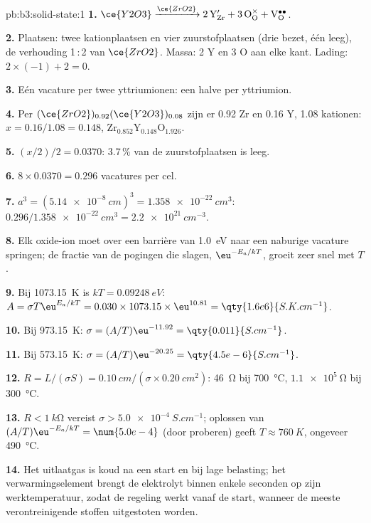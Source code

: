 \begin{solution}{pb:b3:solid-state:1}
\textbf{1.} $\ce{Y2O3} \xrightarrow{\ce{ZrO2}} \mathrm{2\,Y_{Zr}' + 3\,O_O^{\times} + V_O^{\bullet\bullet}}$.

\textbf{2.} Plaatsen: twee kationplaatsen en vier zuurstofplaatsen (drie
bezet, één leeg), de verhouding 1\,:\,2 van $\ce{ZrO2}$. Massa: 2 Y en 3 O aan elke kant. Lading: $2 \times (-1) + 2 = 0$.

\textbf{3.} Eén vacature per twee yttriumionen: een halve per yttriumion.

\textbf{4.} Per $(\ce{ZrO2})_{0.92}(\ce{Y2O3})_{0.08}$ zijn er 0.92 Zr en 0.16 Y, 1.08 kationen: $x = 0.16/1.08 = 0.148$,
$\mathrm{Zr_{0.852}Y_{0.148}O_{1.926}}$.

\textbf{5.} $(x/2)/2 = 0.0370$: 3.7\,\% van de zuurstofplaatsen is leeg.

\textbf{6.} $8 \times 0.0370 = 0.296$ vacatures per cel.

\textbf{7.} $a^3 = (\qty{5.14e-8}{cm})^3 = \qty{1.358e-22}{cm^3}$: $0.296/\qty{1.358e-22}{cm^3} = \qty{2.2e21}{cm^{-3}}$.

\textbf{8.} Elk oxide-ion moet over een barrière van \qty{1.0}{eV} naar een
naburige vacature springen; de fractie van de pogingen die slagen, $\eu^{-E_a/kT}$, groeit zeer snel met $T$.

\textbf{9.} Bij \qty{1073.15}{K} is $kT = \qty{0.09248}{eV}$: $A = \sigma T\eu^{E_a/kT} = 0.030 \times 1073.15 \times \eu^{10.81} = \qty{1.6e6}{S.K.cm^{-1}}$.

\textbf{10.} Bij \qty{973.15}{K}: $\sigma = (A/T)\eu^{-11.92} = \qty{0.011}{S.cm^{-1}}$.

\textbf{11.} Bij \qty{573.15}{K}: $\sigma = (A/T)\eu^{-20.25} = \qty{4.5e-6}{S.cm^{-1}}$.

\textbf{12.} $R = L/(\sigma S) = \qty{0.10}{cm}/(\sigma \times \qty{0.20}{cm^2})$: \qty{46}{\ohm} bij \qty{700}{\celsius}, $\qty{1.1e5}{\ohm}$ bij \qty{300}{\celsius}.

\textbf{13.} $R < \qty{1}{k\ohm}$ vereist $\sigma > \qty{5.0e-4}{S.cm^{-1}}$; oplossen van $(A/T)\eu^{-E_a/kT} = \num{5.0e-4}$ (door proberen)
geeft $T \approx \qty{760}{K}$, ongeveer \qty{490}{\celsius}.

\textbf{14.} Het uitlaatgas is koud na een start en bij lage belasting; het
verwarmingselement brengt de elektrolyt binnen enkele seconden op zijn
werktemperatuur, zodat de regeling werkt vanaf de start, wanneer de
meeste verontreinigende stoffen uitgestoten worden.


\end{solution}
